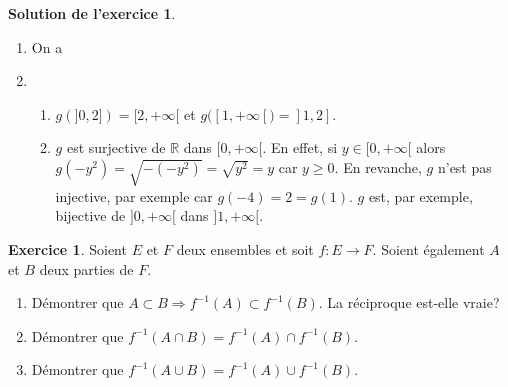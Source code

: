\documentclass[a4paper, 11pt,openany]{article}%
\theoremstyle{plain}
\theoremstyle{definition}
\newtheorem{exo}{Exercice}
\newtheorem{sol}{Solution de l'exercice}
\theoremstyle{remark}
\newcommand{\R}{\mathbb{R}}
\begin{document}
\begin{sol}
\begin{enumerate}
\item On a
\begin{center}
\end{center}
\item 
\begin{enumerate}
\item $g(]0,2]) = [2,+\infty[$ et $g([1,+\infty[)=]1,2]$.
\item $g$ est surjective de $\R$ dans $[0,+\infty[$. En effet, si $y \in [0,+\infty[$ alors $g(-y^2) = \sqrt{-(-y^2)} = \sqrt{y^2} =y$ car $y \geqslant 0$. En revanche, $g$ n'est pas injective, par exemple car $g(-4) = 2 = g(1)$. $g$ est, par exemple, bijective de $]0,+\infty[$ dans $]1,+\infty[$.
\end{enumerate}
\end{enumerate}
\end{sol}



\begin{exo}
Soient $E$ et $F$ deux ensembles et soit $f:E \to F$. Soient également $A$ et $B$ deux parties de $F$.
\begin{enumerate}
\item Démontrer que $A \subset B \Rightarrow f^{-1}(A) \subset f^{-1}(B)$. La réciproque est-elle vraie?
\item Démontrer que $f^{-1}(A \cap B)=f^{-1}(A) \cap f^{-1}(B)$.
\item Démontrer que $f^{-1}(A \cup B)=f^{-1}(A) \cup f^{-1}(B)$.
\end{enumerate}
\end{exo}
\end{document}
